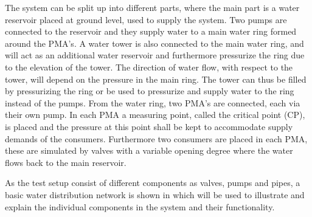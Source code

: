 The system can be split up into different parts, where the main part is a water reservoir placed at ground level, used to supply the system. Two pumps are connected to the reservoir and they supply water to a main water ring formed around the PMA's. 
A water tower is also connected to the main water ring, and will act as an additional water reservoir and furthermore pressurize the ring due to the elevation of the tower. The direction of water flow, with respect to the tower, will depend on the pressure in the main ring. The tower can thus be filled by pressurizing the ring or be used to pressurize and supply water to the ring instead of the pumps.  
From the water ring, two PMA's are connected, each via their own pump. In each PMA a measuring point, called the critical point (CP), is placed and the pressure at this point shall be kept to accommodate supply demands of the consumers. Furthermore two consumers are placed in each PMA, these are simulated by valves with a variable opening degree where the water flows back to the main reservoir.    

As the test setup consist of different components as valves, pumps and pipes, a basic water distribution network is shown in  which will be used to illustrate and explain the individual components in the system and their functionality.   
	
